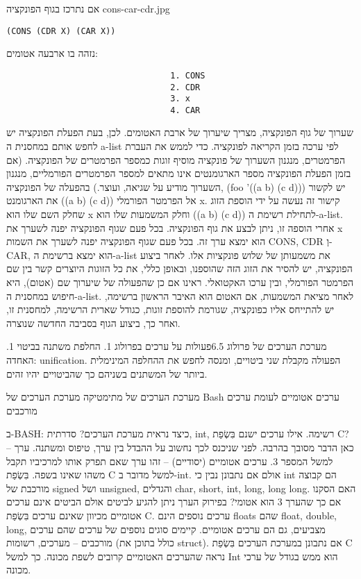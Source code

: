 \begin{טבלא}[!htbp]
      אם נתרכז בגוף הפונקציה
      cons-car-cdr.jpg

\begin{verbatim}
(CONS (CDR X) (CAR X))
\end{verbatim}
      נזהה בו ארבעה אטומים:
\begin{verbatim}
                                 1. CONS
                                 2. CDR
                                 3. x
                                 4. CAR
\end{verbatim}
      שערוך של גוף הפונקציה, מצריך שיערוך של ארבת האטומים. לכן, בעת הפעלת הפונקציה יש לחפש אותם במחסנית ה a-list לפי ערכה בזמן הקריאה לפונקציה. כדי לממש את העברת הפרמטרים, מנגנון השערוך של פונקציה מוסיף זוגות כמספר הפרמטרים של הפונקציה. (אם בזמן הפעלת הפונקציה מספר הארגומנטים אינו מתאים למספר הפרמטרים הפורמליים, מנגנון השערוך מודיע על שגיאה, ועוצר.)
      בהפעלה של הפונקציה,
      (foo '((a b) (c d)))
      יש לקשור את הארגומנט ((a b) (c d)) אל הפרמטר הפורמלי x. קישור זה נעשה על ידי הוספת הזוג שחלק השם שלו הוא x וחלק המשמעות שלו הוא ((a b) (c d)) לתחילת רשימת ה-a-list. אחרי הוספה זו, ניתן לבצע את גוף הפונקציה. בכל פעם שגוף הפונקציה יפנה לשערך את x הוא ימצא ערך זה. בכל פעם שגוף הפונקציה יפנה לשערך את השמות CONS, CDR וְ-CAR, הוא ימצא ברשימת ה-a-list את משמעותן של שלוש פונקציות אלו. לאחר ביצוע הפונקציה, יש להסיר את הזוג הזה שהוספנו, ובאופן כללי, את כל הזוגות היוצרים קשר בין שם הפרמטר הפורמלי, ובין ערכו האקטואלי.
      ראינו אם כן שהפעולה של שיערוך שם (אטום), היא חיפוש במחסנית ה-a-list. לאחר מציאת המשמעות, אם האטום הוא האיבר הראשון ברשימה, יש להתייחס אליו כפונקציה, שגורמת להוספת זוגות, כגודל שארית הרשימה, למחסנית זו, ואחר כך, ביצוע הגוף בסביבה החדשה שנוצרה.

      מערכת הערכים של פרולוג
      6.5פעולות על ערכים בפרולוג
      1. החלפת משתנה בביטוי
      1. האחדה: unification. הפעולה מקבלת שני ביטויים, ומנסה לחפש את ההחלפה המינימלית ביותר של המשתנים בשניהם כך שהביטויים יהיו זהים.

      מערכת הערכים של מתימטיקה
      מערכת הערכים של Bash
      ערכים אטומיים לעומת ערכים מורכבים

      ב-BASH: כיצד נראית מערכת הערכים?
      סדרתית, int, רשימה.
      אילו ערכים ישנם בִּשְׂפַת C?
      כאן הדבר מסובך בהרבה. לפני שניכנס לכך נחשוב על ההבדל בין ערך, טיפוס ומשתנה.
      ערך – למשל המספר 3. ערכים אטומיים (יסודיים) – זהו ערך שאם תפרק אותו למרכיביו תקבל משהו שאינו בשפה. בִּשְׂפַת C למשל מדובר ב-int. אולם אם נתבונן נבין כי int הם קבוצה מורכבת של signed ושל unsigned, והגדלים char, short, int, long, long long.
      האם הסקנו אם כך שהערך 3 הוא אטומי? בפירוק הערך ניתן להגיע לביטים אולם הביטים אינם ערכים אטומיים מכיוון שאינם ערכים בִּשְׂפַת C.
      ערכים נוספים הינם floats שהם float, double, long, מצביעים, גם הם ערכים אטומיים.
      קיימים סוגים נוספים של ערכים שהם ערכים מורכבים – מערכים, רשומות (כולל בתוכן את struct).
      אם נתבונן במערכת הערכים בִּשְׂפַת C נראה שהערכים האטומיים קרובים לשפת מכונה. כך למשל Int הוא ממש בגודל של ערכי מכונה.


\end{טבלא}
